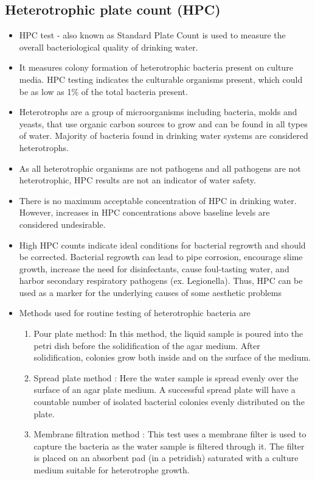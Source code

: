\subsection{Heterotrophic plate count (HPC) }
\begin{itemize}
\item HPC test - also known as Standard Plate Count is used to measure the overall bacteriological quality of drinking water.
\item  It measures colony formation of heterotrophic bacteria present on culture media. HPC testing indicates the culturable organisms present, which could be as low as 1\% of the total bacteria present. 
\item Heterotrophs are a group of microorganisms including bacteria, molds and yeasts, that use organic carbon sources to grow and can be found in all types of water. Majority of bacteria found in drinking water systems are considered heterotrophs.
\item As all heterotrophic organisms are not pathogens and all pathogens are not heterotrophic, HPC results are not an indicator of water safety.
\item There is no maximum acceptable concentration of HPC in drinking water. However, increases in HPC concentrations above baseline levels are considered undesirable.

\item High HPC counts indicate ideal conditions for bacterial regrowth and should be corrected. Bacterial regrowth can lead to pipe corrosion, encourage slime growth, increase the need for disinfectants, cause foul-tasting water, and harbor secondary respiratory pathogens (ex. Legionella). Thus, HPC can be used as a marker for the underlying causes of some aesthetic problems

\item Methods used for routine testing of heterotrophic bacteria are
\begin{enumerate}
\item Pour plate method: In this method, the liquid sample is poured into the petri dish before the solidification of the agar medium. After solidification, colonies grow both inside and on the surface of the medium.
\item Spread plate method : Here the water sample is spread evenly over the surface of an agar plate medium.  A successful spread plate will have a countable number of isolated bacterial colonies evenly distributed on the plate.
\item Membrane filtration method : This test uses a membrane filter is used to capture the bacteria as the water sample is filtered through it.  The filter is placed on an absorbent pad (in a petridish) saturated with a culture medium suitable for heterotrophe growth.
\end{enumerate}

\end{itemize}

